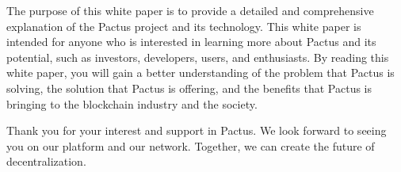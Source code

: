 \documentclass{novel}
\begin{document}
The purpose of this white paper is to provide a detailed and comprehensive explanation of the Pactus project and its technology. This white paper is intended for anyone who is interested in learning more about Pactus and its potential, such as investors, developers, users, and enthusiasts. By reading this white paper, you will gain a better understanding of the problem that Pactus is solving, the solution that Pactus is offering, and the benefits that Pactus is bringing to the blockchain industry and the society.

Thank you for your interest and support in Pactus. We look forward to seeing you on our platform and our network. Together, we can create the future of decentralization.
\end{document}
